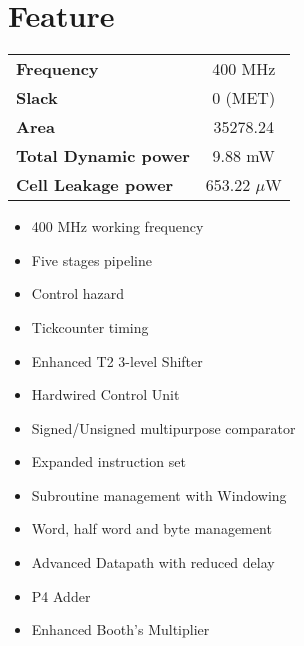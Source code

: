 \chapter{Feature}
\begin{center}
\begin{tabular}{ l c }
	\textbf{Frequency} & 400 MHz \\ 
	\textbf{Slack} & 0 (MET) \\  
	\textbf{Area} & 35278.24 \\  
	\textbf{Total Dynamic power} & 9.88 mW \\  
	\textbf{Cell Leakage power} & 653.22 $\mu$W
\end{tabular}

\end{center}
\hfill

\hfill

\begin{multicols}{2}
\begin{itemize}
\item 400 MHz working frequency
\item Five stages pipeline
\item Control hazard
\item Tickcounter timing
\item Enhanced T2 3-level Shifter
\item Hardwired Control Unit
\item Signed/Unsigned multipurpose comparator
\end{itemize}

\columnbreak

\begin{itemize}
\item Expanded instruction set
\item Subroutine management with Windowing
\item Word, half word and byte management
\item Advanced Datapath with reduced delay
\item P4 Adder
\item Enhanced Booth's Multiplier
\end{itemize}
\end{multicols}